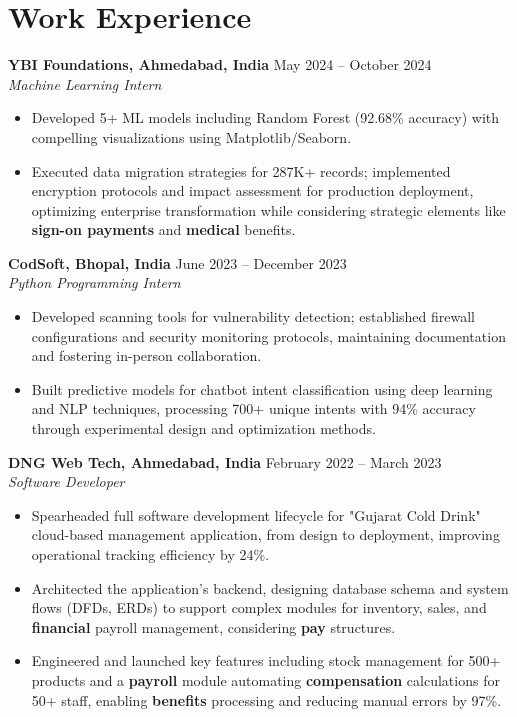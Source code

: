 \documentclass[a4paper,10pt]{article}
\begin{document}
\section*{Work Experience}
\textbf{YBI Foundations, Ahmedabad, India} \hfill May 2024 -- October 2024\\
\textit{Machine Learning Intern} \\
\begin{itemize}[leftmargin=*, itemsep=0pt, parsep=1pt]
\vspace{-6mm}
\item Developed 5+ ML models including Random Forest (92.68\% accuracy) with compelling visualizations using Matplotlib/Seaborn.
\item Executed data migration strategies for 287K+ records; implemented encryption protocols and impact assessment for production deployment, optimizing enterprise transformation while considering strategic elements like \textbf{sign-on payments} and \textbf{medical} benefits.
\end{itemize}
\textbf{CodSoft, Bhopal, India} \hfill June 2023 -- December 2023\\
\textit{Python Programming Intern} \\
\begin{itemize}[leftmargin=*, itemsep=0pt, parsep=1pt]
\vspace{-6mm}
\item Developed scanning tools for vulnerability detection; established firewall configurations and security monitoring protocols, maintaining documentation and fostering in-person collaboration.
\item Built predictive models for chatbot intent classification using deep learning and NLP techniques, processing 700+ unique intents with 94\% accuracy through experimental design and optimization methods.
\vspace{-1mm}
\end{itemize}

\textbf{DNG Web Tech, Ahmedabad, India} \hfill February 2022 -- March 2023 \\
\textit{Software Developer} \\

\begin{itemize}[leftmargin=*, itemsep=0pt, parsep=1pt] %
\vspace{-7mm}
    \item Spearheaded full software development lifecycle for "Gujarat Cold Drink" cloud-based management application, from design to deployment, improving operational tracking efficiency by 24\%.
\item Architected the application's backend, designing database schema and system flows (DFDs, ERDs) to support complex modules for inventory, sales, and \textbf{financial} payroll management, considering \textbf{pay} structures.
\item Engineered and launched key features including stock management for 500+ products and a \textbf{payroll} module automating \textbf{compensation} calculations for 50+ staff, enabling \textbf{benefits} processing and reducing manual errors by 97\%. 

\end{itemize}
\end{document}
